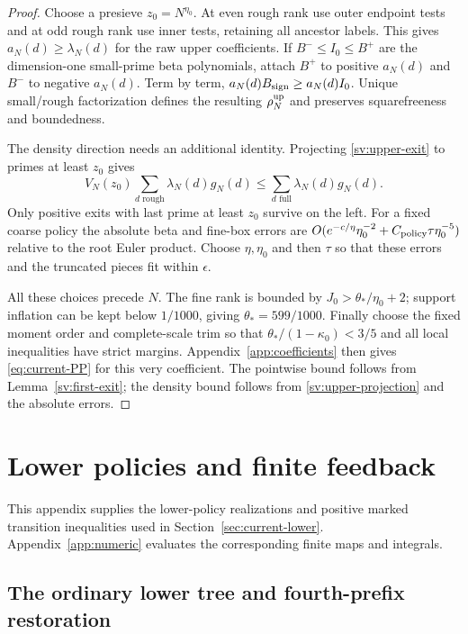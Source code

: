 \begin{proof}
Choose a presieve $z_0=N^{\eta_0}$.  At even rough rank use outer
endpoint tests and at odd rough rank use inner tests, retaining all
ancestor labels.  This gives $a_N(d)\ge\lambda_N(d)$ for the
raw upper coefficients.  If $B^-\le I_0\le B^+$ are the
dimension-one small-prime beta polynomials, attach $B^+$ to
positive $a_N(d)$ and $B^-$ to negative $a_N(d)$.  Term by term,
$a_N(d)B_{\rm sign}\ge a_N(d)I_0$.  Unique small/rough
factorization defines the resulting $\rho_N^{\rm up}$ and preserves
squarefreeness and boundedness.

The density direction needs an additional identity.  Projecting
\eqref{sv:upper-exit} to primes at least $z_0$ gives
\begin{equation}\label{sv:upper-projection}
 V_N(z_0)\sum_{d\text{ rough}}\lambda_N(d)g_N(d)
       \le\sum_{d\text{ full}}\lambda_N(d)g_N(d).
\end{equation}
Only positive exits with last prime at least $z_0$ survive on the
left.  For a fixed coarse policy the absolute beta and fine-box
errors are
$O(e^{-c/\eta}\eta_0^{-2}+C_{\rm policy}\tau\eta_0^{-5})$
relative to the root Euler product.  Choose $\eta,\eta_0$ and
then $\tau$ so that these errors and the truncated pieces fit
within $\epsilon$.

All these choices precede $N$.  The fine rank is bounded by
$J_0>\theta_*/\eta_0+2$; support inflation can be kept below
$1/1000$, giving $\theta_*=599/1000$.
Finally choose the fixed moment order and complete-scale trim so
that $\theta_*/(1-\kappa_0)<3/5$ and all local inequalities have
strict margins.  Appendix~\ref{app:coefficients} then gives
\eqref{eq:current-PP} for this very coefficient.  The pointwise
bound follows from Lemma~\ref{sv:first-exit}; the density bound
follows from \eqref{sv:upper-projection} and the absolute errors.
\end{proof}

\section{Lower policies and finite feedback}\label{app:lower}

This appendix supplies the lower-policy realizations and positive marked transition inequalities used in Section~\ref{sec:current-lower}. Appendix~\ref{app:numeric} evaluates the corresponding finite maps and integrals.

\subsection{The ordinary lower tree and fourth-prefix restoration}

